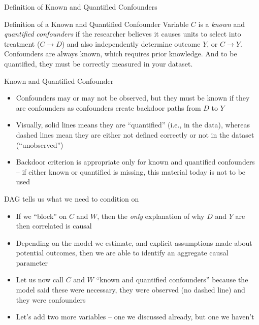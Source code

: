 \documentclass{beamer}
\begin{document}
\begin{frame}{Definition of Known and Quantified Confounders}
	
	
	\begin{block}{Definition of a Known and Quantified Confounder}
	Variable $C$ is a \emph{known} and \emph{quantified} \emph{confounders} if the researcher believes it causes units to select into treatment ($C \rightarrow D$) and also independently determine outcome $Y$, or $C \rightarrow Y$. Confounders are always known, which requires prior knowledge. And to be quantified, they must be correctly measured in your dataset.
	\end{block}
	
	
\end{frame}

\begin{frame}{Known and Quantified Confounder}

	\begin{itemize}
	\item Confounders may or may not be observed, but they must be known if they are confounders as confounders create backdoor paths from $D$ to $Y$
	\item Visually, solid lines means they are ``quantified'' (i.e., in the data), whereas dashed lines mean they are either not defined correctly or not in the dataset (``unobserved'')
	\item Backdoor criterion is appropriate only for known and quantified confounders -- if either known or quantified is missing, this material today is not to be used
	\end{itemize}

\end{frame}

\begin{frame}{DAG tells us what we need to condition on}

\begin{itemize}

\item If we ``block'' on $C$ and $W$, then the \emph{only} explanation of why $D$ and $Y$ are then correlated is causal
\item Depending on the model we estimate, and explicit assumptions made about potential outcomes, then we are able to identify an aggregate causal parameter
\item Let us now call $C$ and $W$ ``known and quantified confounders'' because the model said these were necessary, they were observed (no dashed line) and they were confounders
\item Let's add two more variables -- one we discussed already, but one we haven't

\end{itemize}

\end{frame}
\end{document}
